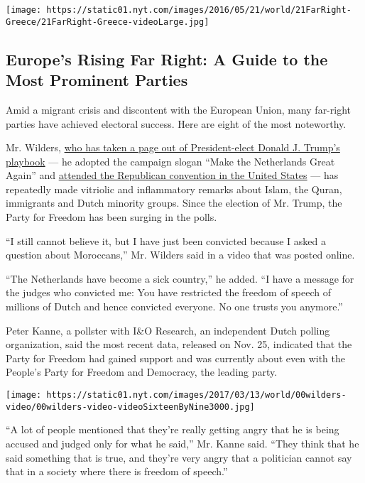 \href{https://www.nytimes.com/interactive/2016/world/europe/europe-far-right-political-parties-listy.html}{}

\texttt{[image: https://static01.nyt.com/images/2016/05/21/world/21FarRight-Greece/21FarRight-Greece-videoLarge.jpg]}

\hypertarget{europes-rising-far-right-a-guide-to-the-most-prominent-parties}{%
\subsection{Europe's Rising Far Right: A Guide to the Most Prominent
Parties}\label{europes-rising-far-right-a-guide-to-the-most-prominent-parties}}

Amid a migrant crisis and discontent with the European Union, many
far-right parties have achieved electoral success. Here are eight of the
most noteworthy.

Mr. Wilders,
\href{http://www.nytimes.com/2016/11/12/world/europe/donald-trump-marine-le-pen.html}{who
has taken a page out of President-elect Donald J. Trump's playbook} ---
he adopted the campaign slogan ``Make the Netherlands Great Again'' and
\href{https://www.youtube.com/watch?v=k94uGHHDGUE\&feature=youtu.be}{attended
the Republican convention in the United States} --- has repeatedly made
vitriolic and inflammatory remarks about Islam, the Quran, immigrants
and Dutch minority groups. Since the election of Mr. Trump, the Party
for Freedom has been surging in the polls.

``I still cannot believe it, but I have just been convicted because I
asked a question about Moroccans,'' Mr. Wilders said in a video that was
posted online.

``The Netherlands have become a sick country,'' he added. ``I have a
message for the judges who convicted me: You have restricted the freedom
of speech of millions of Dutch and hence convicted everyone. No one
trusts you anymore.''

Peter Kanne, a pollster with I\&O Research, an independent Dutch polling
organization, said the most recent data, released on Nov. 25, indicated
that the Party for Freedom had gained support and was currently about
even with the People's Party for Freedom and Democracy, the leading
party.

\texttt{[image: https://static01.nyt.com/images/2017/03/13/world/00wilders-video/00wilders-video-videoSixteenByNine3000.jpg]}

``A lot of people mentioned that they're really getting angry that he is
being accused and judged only for what he said,'' Mr. Kanne said. ``They
think that he said something that is true, and they're very angry that a
politician cannot say that in a society where there is freedom of
speech.''

